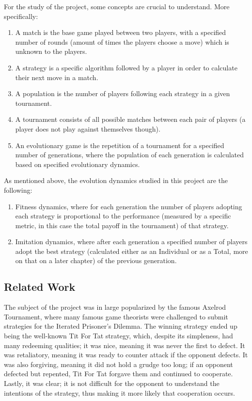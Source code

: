 \documentclass[12pt]{article}
\begin{document}
For the study of the project, some concepts are crucial to understand. More specifically:
\begin{enumerate}
  \item A match is the base game played between two players, with a specified number of rounds (amount of times the players choose a move) which is unknown to the players.
  \item A strategy is a specific algorithm followed by a player in order to calculate their next move in a match.
  \item A population is the number of players following each strategy in a given tournament.
  \item A tournament consists of all possible matches between each pair of players (a player does not play against themselves though).
  \item An evolutionary game is the repetition of a tournament for a specified number of generations, where the population of each generation is calculated based on specified evolutionary dynamics.
\end{enumerate}

As mentioned above, the evolution dynamics studied in this project are the following:
\begin{enumerate}
  \item Fitness dynamics, where for each generation the number of players adopting each strategy is proportional to the performance (measured by a specific metric, in this case the total payoff in the tournament) of that strategy.
  \item Imitation dynamics, where after each generation a specified number of players adopt the best strategy (calculated either as an Individual or as a Total, more on that on a later chapter) of the previous generation.
\end{enumerate}

\subsection{Related Work}
The subject of the project was in large popularized by the famous Axelrod Tournament, where many famous game theorists were challenged to submit strategies for the Iterated Prisoner's Dilemma. The winning strategy ended up being the well-known Tit For Tat strategy, which, despite its simpleness, had many redeeming qualities; it was nice, meaning it was never the first to defect. It was retaliatory, meaning it was ready to counter attack if the opponent defects. It was also forgiving, meaning it did not hold a grudge too long; if an opponent defected but repented, Tit For Tat forgave them and continued to cooperate. Lastly, it was clear; it is not difficult for the opponent to understand the intentions of the strategy, thus making it more likely that cooperation occurs.
\end{document}
